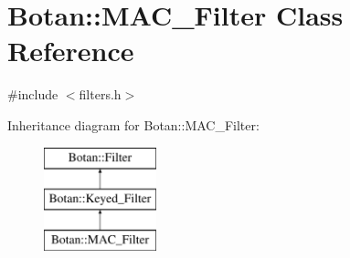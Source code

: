 \hypertarget{classBotan_1_1MAC__Filter}{\section{Botan\-:\-:M\-A\-C\-\_\-\-Filter Class Reference}
\label{classBotan_1_1MAC__Filter}
}


{\ttfamily \#include $<$filters.\-h$>$}

Inheritance diagram for Botan\-:\-:M\-A\-C\-\_\-\-Filter\-:\begin{figure}[H]
\begin{center}
\leavevmode
\includegraphics[height=3.000000cm]{classBotan_1_1MAC__Filter}
\end{center}
\end{figure}
